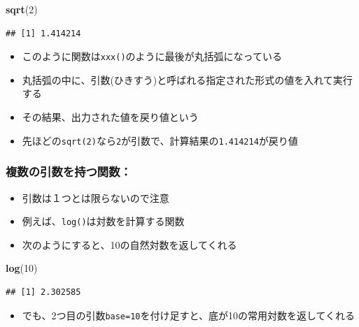 \documentclass[
]{book}
\newenvironment{Shaded}{\begin{snugshade}}{\end{snugshade}}
\newcommand{\DecValTok}[1]{\textcolor[rgb]{0.00,0.00,0.81}{#1}}
\newcommand{\FunctionTok}[1]{\textcolor[rgb]{0.13,0.29,0.53}{\textbf{#1}}}
\newcommand{\NormalTok}[1]{#1}
\providecommand{\tightlist}{%
  \setlength{\itemsep}{0pt}\setlength{\parskip}{0pt}}
\begin{document}
\begin{Shaded}
\begin{Highlighting}[]
\FunctionTok{sqrt}\NormalTok{(}\DecValTok{2}\NormalTok{)}
\end{Highlighting}
\end{Shaded}

\begin{verbatim}
## [1] 1.414214
\end{verbatim}

\begin{itemize}
\tightlist
\item
  このように関数は\texttt{xxx()}のように最後が丸括弧になっている
\item
  丸括弧の中に、引数(ひきすう)と呼ばれる指定された形式の値を入れて実行する
\item
  その結果、出力された値を戻り値という
\item
  先ほどの\texttt{sqrt(2)}なら\texttt{2}が引数で、計算結果の\texttt{1.414214}が戻り値
\end{itemize}

\hypertarget{ux8907ux6570ux306eux5f15ux6570ux3092ux6301ux3064ux95a2ux6570}{%
\subsubsection*{複数の引数を持つ関数：}\label{ux8907ux6570ux306eux5f15ux6570ux3092ux6301ux3064ux95a2ux6570}}

\begin{itemize}
\tightlist
\item
  引数は１つとは限らないので注意
\item
  例えば、\texttt{log()}は対数を計算する関数
\item
  次のようにすると、10の自然対数を返してくれる
\end{itemize}

\begin{Shaded}
\begin{Highlighting}[]
\FunctionTok{log}\NormalTok{(}\DecValTok{10}\NormalTok{)}
\end{Highlighting}
\end{Shaded}

\begin{verbatim}
## [1] 2.302585
\end{verbatim}

\begin{itemize}
\tightlist
\item
  でも、2つ目の引数\texttt{base=10}を付け足すと、底が10の常用対数を返してくれる
\end{itemize}
\end{document}

